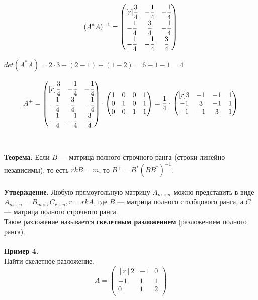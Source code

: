 \documentclass[12pt]{article}
\theoremstyle{definition}
\numberwithin{equation}{section}
\begin{document}
\[(A^*A)^{-1} = \begin{pmatrix}[r]
\cfrac{3}{4} & -\cfrac{1}{4} & -\cfrac{1}{4} \\         
-\cfrac{1}{4} & \cfrac{3}{4} & -\cfrac{1}{4} \\
-\cfrac{1}{4} & -\cfrac{1}{4} & \cfrac{3}{4} \\
\end{pmatrix}\]
\begin{center}$det (A^*A)=2\cdot 3-(2-1)+(1-2)=6-1-1=4$\end{center}
\[A^+ = \begin{pmatrix}[r]
\cfrac{3}{4} & -\cfrac{1}{4} & -\cfrac{1}{4} \\         
-\cfrac{1}{4} & \cfrac{3}{4} & -\cfrac{1}{4} \\
-\cfrac{1}{4} & -\cfrac{1}{4} & \cfrac{3}{4} \\
\end{pmatrix} \cdot \begin{pmatrix}
1 & 0 & 0 & 1 \\         
0 & 1 & 0 & 1\\
0 & 0 & 1 & 1\\
\end{pmatrix} = \frac{1}{4} \cdot \begin{pmatrix}[r]
3 & -1 & -1 & 1 \\         
-1 & 3 & - 1 & 1 \\
-1 & -1 & 3 & 1 \\
\end{pmatrix}\]\\
\\
\textbf{Теорема.}
Если $B$ --- матрица полного строчного ранга (строки линейно независимы), то есть $rkB=m$, то $B^+=B^*(BB^*)^{-1}$.\\ \\
\textbf{Утверждение.}
Любую прямоугольную матрицу $A_{m \times n}$ можно представить в виде 
$A_{m \times n}=B_{m \times r}C_{r \times n}, r=rkA$, где $B$ --- матрица полного столбцового ранга, а $C$ --- матрица полного строчного ранга.\\
Такое разложение называется \textbf{скелетным разложением} (разложением полного ранга).\\ \\
\textbf{Пример 4.}\\
Найти скелетное разложение.\\
\[A = \begin{pmatrix}[r]
2 & -1 & 0 \\         
-1 & 1 & 1 \\
0 & 1 & 2 \\
\end{pmatrix}\]
\end{document}
